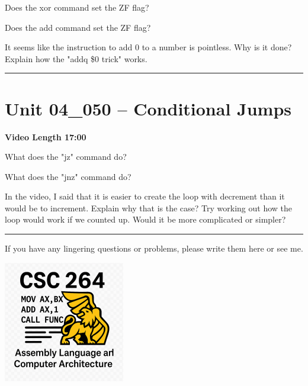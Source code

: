 \documentclass[letterpaper,12pt]{exam}
\newcommand{\unit}{Unit 04}
\begin{document}
\begin{questions}
\begin{samepage}
    \question Does the xor command set the ZF flag?
    \vspace{5mm}
\end{samepage}
\par
 
\begin{samepage}
    \question Does the add command set the ZF flag?
    \vspace{5mm}
\end{samepage}
\par
 \begin{samepage}
     \question It seems like the instruction to add 0 to a number is pointless.  Why is it done?  Explain how the "addq \$0 trick" works.
     \vspace{20mm}
 \end{samepage}
 \par
  

\rule{0.5\textwidth}{.4pt} %
\section*{\unit\_050 -- Conditional Jumps}
\par{\selectfont\textbf{Video Length 17:00}}
\begin{samepage}
    \question What does the "jz" command do?
    \vspace{5mm}
\end{samepage}
\par
\begin{samepage}
    \question What does the "jnz" command do?
    \vspace{5mm}
\end{samepage}
\par
 
\begin{samepage}
    \question In the video, I said that it is easier to create the loop with decrement than it would be to increment.  Explain why that is the case?  Try working out how the loop would work if we counted up.  Would it be more complicated or simpler?
    \vspace{25mm}
\end{samepage}

\end{questions} 
\begin{center}
    \rule{0.667\textwidth}{.8pt} %
\end{center}


If you have any lingering questions or problems, please write them here or see me.
\vfill
\begin{center}
\includegraphics{../csc264Logo}
\end{center}
\end{document}
